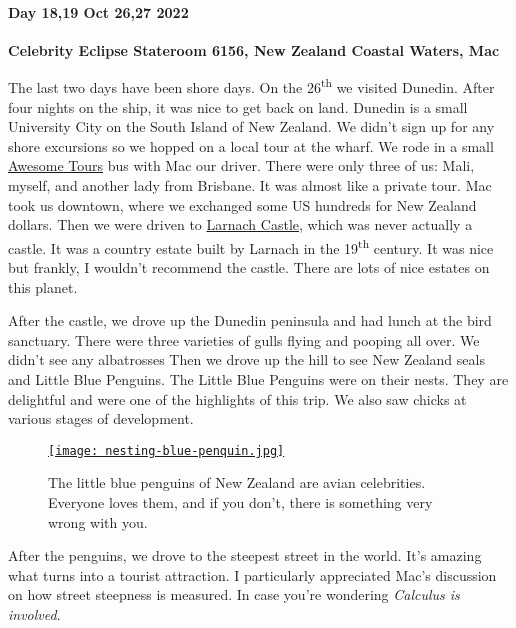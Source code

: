 \hypertarget{day-1819-oct-2627-2022}{%
\paragraph{\texorpdfstring{\textbf{Day 18,19 Oct 26,27 2022}}{Day 18,19 Oct 26,27 2022}}\label{day-1819-oct-2627-2022}}

\textbf{Celebrity Eclipse Stateroom 6156, New Zealand Coastal Waters, Mac}

The last two days have been shore days. On the 26\textsuperscript{th} we
visited Dunedin. After four nights on the ship, it was nice to get back
on land. Dunedin is a small University City on the South Island of New
Zealand. We didn't sign up for any shore excursions so we hopped on a
local tour at the wharf. We rode in a small
\href{https://awesometours.co.nz/}{Awesome Tours} bus with Mac our
driver. There were only three of us: Mali, myself, and another lady from
Brisbane. It was almost like a private tour. Mac took us downtown, where
we exchanged some US hundreds for New Zealand dollars. Then we were
driven to \href{https://www.larnachcastle.co.nz/}{Larnach Castle}, which
was never actually a castle. It was a country estate built by Larnach in
the 19\textsuperscript{th} century. It was nice but frankly, I wouldn't
recommend the castle. There are lots of nice estates on this planet.

After the castle, we drove up the Dunedin peninsula and had lunch at the
bird sanctuary. There were three varieties of gulls flying and pooping
all over. We didn't see any albatrosses Then we drove up the hill to see
New Zealand seals and Little Blue Penguins. The Little Blue Penguins
were on their nests. They are delightful and were one of the highlights
of this trip. We also saw chicks at various stages of development.


\captionsetup[figure]{labelformat=empty}
\begin{SCfigure}
\centering
\href{https://conceptcontrol.smugmug.com/Trips/Overseas/Australia-New-Zealand-2022/i-mnh9FHw/A}{\texttt{[image: nesting-blue-penquin.jpg]}}
\caption[Nesting blue penguins]{The little blue penguins of New Zealand are avian celebrities.
Everyone loves them, and if you don't, there is something very wrong
with you.}
\label{fig:7606x3}
\end{SCfigure}

After the penguins, we drove to the steepest street in the world. It's
amazing what turns into a tourist attraction. I particularly appreciated
Mac's discussion on how street steepness is measured. In case you're
wondering \emph{Calculus is involved}.

